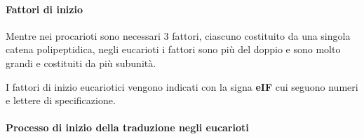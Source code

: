 \documentclass[]{article}
\begin{document}
\paragraph{Fattori di inizio}\label{fattori-di-inizio}

Mentre nei procarioti sono necessari 3 fattori, ciascuno costituito da
una singola catena polipeptidica, negli eucarioti i fattori sono più del
doppio e sono molto grandi e costituiti da più subunità.

I fattori di inizio eucariotici vengono indicati con la signa
\textbf{eIF} cui seguono numeri e lettere di specificazione.

\paragraph{Processo di inizio della traduzione negli
eucarioti}\label{processo-di-inizio-della-traduzione-negli-eucarioti}
\end{document}
